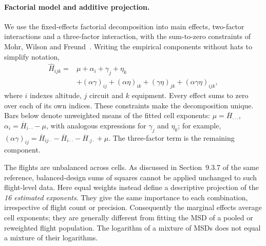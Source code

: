 \paragraph{Factorial model and additive projection.}
We use the fixed-effects factorial decomposition into main effects, two-factor
interactions and a three-factor interaction, with the sum-to-zero constraints
of Mohr, Wilson and Freund~\cite[Sections~9.3.1 and~9.7]{mohr2022statistical}.
Writing the empirical components without hats to simplify notation,
\begin{equation}
 \begin{aligned}
 \widehat H_{ijk}={}&\mu+\alpha_i+\gamma_j+\eta_k\\
 &+(\alpha\gamma)_{ij}+(\alpha\eta)_{ik}
   +(\gamma\eta)_{jk}+(\alpha\gamma\eta)_{ijk},
 \end{aligned}
 \label{eq:factorial-decomposition}
\end{equation}
where $i$ indexes altitude, $j$ circuit and $k$ equipment. Every effect sums to
zero over each of its own indices. These constraints make the decomposition
unique. Bars below denote unweighted means of the fitted cell exponents:
$\mu=\overline H_{\cdot\cdot\cdot}$,
$\alpha_i=\overline H_{i\cdot\cdot}-\mu$, with analogous expressions for
$\gamma_j$ and $\eta_k$; for example,
$(\alpha\gamma)_{ij}=\overline H_{ij\cdot}
-\overline H_{i\cdot\cdot}-\overline H_{\cdot j\cdot}+\mu$.
The three-factor term is the remaining component.

The flights are unbalanced across cells. As discussed in
Section~9.3.7 of the same reference, balanced-design sums of squares cannot be
applied unchanged to such flight-level data. Here equal weights instead define
a descriptive projection of the \emph{16 estimated exponents}. They give the
same importance to each combination, irrespective of flight count or precision.
Consequently the marginal effects average cell exponents; they are generally
different from fitting the MSD of a pooled or reweighted flight population.
The logarithm of a mixture of MSDs does not equal a mixture of their logarithms.

